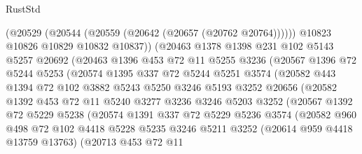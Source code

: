 \begin{lexlean}{RustStd}
\begin{coremodule}
                  (@20529 (@20544 (@20559 (@20642 (@20657 (@20762 @20764))))))
                  @10823
                  @10826
                  @10829
                  @10832
                  @10837))
              (@20463
                @1378
                @1398
                @231
                @102
                @5143
                @5257
                @20692
                (@20463
                  @1396
                  @453
                  @72
                  @11
                  @5255
                  @3236
                  (@20567
                    @1396
                    @72
                    @5244
                    @5253
                    (@20574
                      @1395
                      @337
                      @72
                      @5244
                      @5251
                      @3574
                      (@20582
                        @443
                        @1394
                        @72
                        @102
                        @3882
                        @5243
                        @5250
                        @3246
                        @5193
                        @3252
                        @20656
                        (@20582
                          @1392
                          @453
                          @72
                          @11
                          @5240
                          @3277
                          @3236
                          @3246
                          @5203
                          @3252
                          (@20567
                            @1392
                            @72
                            @5229
                            @5238
                            (@20574
                              @1391
                              @337
                              @72
                              @5229
                              @5236
                              @3574
                              (@20582
                                @960
                                @498
                                @72
                                @102
                                @4418
                                @5228
                                @5235
                                @3246
                                @5211
                                @3252
                                (@20614 @959 @4418 @13759 @13763)
                                (@20713
                                  @453
                                  @72
                                  @11

\end{coremodule}
\end{lexlean}
